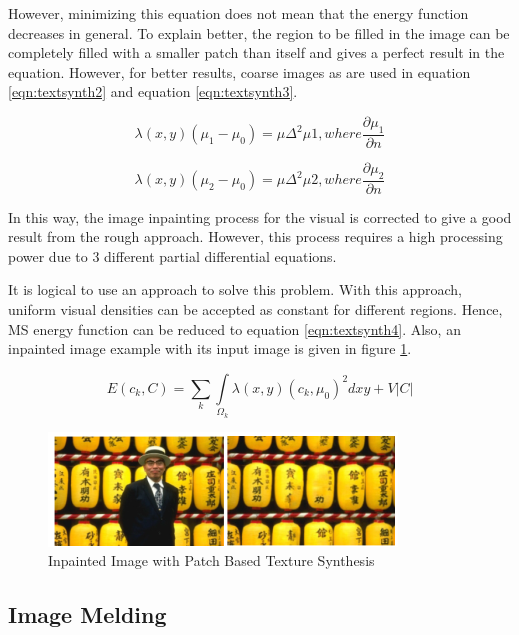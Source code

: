 However, minimizing this equation does not mean that the energy function decreases in general. To explain better, the region to be filled in the image can be completely filled with a smaller patch than itself and gives a perfect result in the equation. However, for better results, coarse images as  are used in equation \ref{eqn:textsynth2} and equation \ref{eqn:textsynth3}.

\begin{equation}
    \label{eqn:textsynth2}
    \lambda(x,y)(\mu_1-\mu_0)=\mu\Delta^2\mu1, where \frac{\partial\mu_1}{\partial n}
\end{equation}

\begin{equation}
    \label{eqn:textsynth3}
    \lambda(x,y)(\mu_2-\mu_0)=\mu\Delta^2\mu2, where \frac{\partial\mu_2}{\partial n}
\end{equation}

In this way, the image inpainting process for the visual is corrected to give a good result from the rough approach. However, this process requires a high processing power due to 3 different partial differential equations.

It is logical to use an approach to solve this problem. With this approach, uniform visual densities can be accepted as constant for different regions. Hence, MS energy function can be reduced to equation \ref{eqn:textsynth4}. Also, an inpainted image example with its input image is given in figure \ref{fig:patch-based-example}.

\begin{equation}
    \label{eqn:textsynth4}
    E(c_k, C) = \sum\limits_{k}\int\limits_{\Omega_k}\lambda(x,y){(c_k,\mu_0)}^2dxy+V|C|
\end{equation}

\begin{figure}[h]
    \centering
    \includegraphics{figures/chapter2/Patch-Based-texture-synth-example.png}
    \caption{Inpainted Image with Patch Based Texture Synthesis}
    \label{fig:patch-based-example}
\end{figure}

\subsection{Image Melding}

